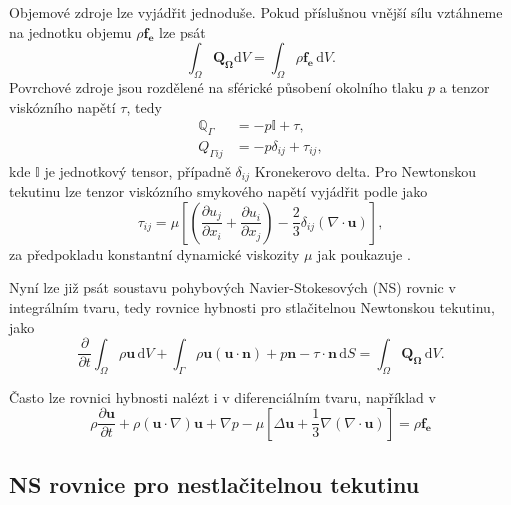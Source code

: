 Objemové zdroje lze vyjádřit jednoduše. Pokud příslušnou vnější sílu vztáhneme na jednotku objemu $\rho \mathbf{f_e}$ lze psát
\begin{equation}
\int_{\Omega} \mathbf{Q_\Omega} \mathrm{d}V = \int_{\Omega} \rho \mathbf{f_e} \,\mathrm{d}V.
\end{equation}
Povrchové zdroje jsou rozdělené na sférické působení okolního tlaku $p$ a tenzor viskózního napětí $\tau$, tedy
\begin{align*}
\mathbb{Q}_\Gamma &= -p \mathbb{I}+\tau, \\
Q_{\Gamma ij}&= -p \delta_{ij}+\tau_{ij},
\end{align*}
kde $\mathbb{I}$ je jednotkový tensor, případně $\delta_{ij}$ Kronekerovo delta. Pro Newtonskou tekutinu lze tenzor viskózního smykového napětí vyjádřit podle \cite{hirsch2007numerical} jako 
\begin{equation}
\tau_{ij}=\mu \left[ \left( \dfrac{\partial u_j}{\partial x_i} + \dfrac{\partial u_i}{\partial x_j} \right) - \dfrac{2}{3} \delta_{ij} \left(\nabla \cdot \mathbf{u}\right)  \right],
\end{equation}
za předpokladu konstantní dynamické viskozity $\mu$ jak poukazuje \cite{dvorak1987vnitrniaerodynamika}.

Nyní lze již psát soustavu pohybových Navier-Stokesových (NS) rovnic v integrálním tvaru, tedy rovnice hybnosti pro stlačitelnou Newtonskou tekutinu, jako
\begin{equation}
\dfrac{\partial}{\partial t} \int_{\Omega} \rho \mathbf{u} \,\mathrm{d}V + \int_{\Gamma} \rho \mathbf{u} (\mathbf{u}\cdot \mathbf{n}) + p\mathbf{n} - \tau \cdot \mathbf{n} \,\mathrm{d}S = \int_\Omega \mathbf{Q_\Omega} \,\mathrm{d}V.
\end{equation}

Často lze rovnici hybnosti nalézt i v diferenciálním tvaru, například v \cite{hirsch2007numerical}
\begin{equation}
\rho \dfrac{\partial \mathbf{u}}{\partial t} + \rho (\mathbf{u} \cdot \nabla)\mathbf{u} +\nabla p - \mu \left[ \Delta \mathbf{u} + \dfrac{1}{3} \nabla(\nabla \cdot \mathbf{u}) \right] = \rho \mathbf{f_e}
\end{equation}

\subsection{NS rovnice pro nestlačitelnou tekutinu}

